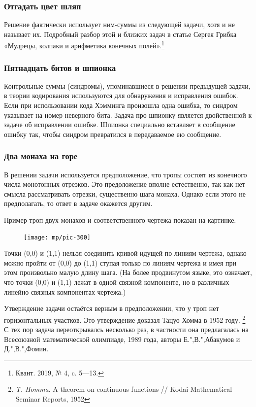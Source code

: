 \documentclass[twoside]{book}
\begin{document}
\subsubsection*{Отгадать цвет шляп}
Решение фактически использует ним-суммы из следующей задачи, хотя и не называет их.
Подробный разбор этой и близких задач в статье Сергея Грибка «Мудрецы, колпаки и арифметика конечных полей».\footnote{Квант. 2019, № 4, c. 5—13.}

\subsubsection{Пятнадцать битов и шпионка}
Контрольные суммы (синдромы), упоминавшиеся  в решении предыдущей задачи, в теории кодирования используются для обнаружения и исправления ошибок.
Если при использовании кода Хэмминга произошла одна ошибка, то синдром указывает на номер неверного бита.
Задача про шпионку является двойственной к задаче об исправлении ошибке.
Шпионка специально вставляет в сообщение ошибку так, чтобы синдром превратился в передаваемое ею сообщение.

\subsubsection{Два монаха на горе}
В решении задачи используется предположение, что тропы состоят из конечного числа монотонных отрезков.
Это предоложение вполне естественно, так как нет смысла рассматривать отрезки, существенно  шага монаха.
Однако если этого не предполагать, то ответ в задаче окажется другим.

Пример троп двух монахов и соответственного чертежа показан на картинке.
\begin{figure}[ht!]
\vskip-0mm
\centering
\texttt{[image: mp/pic-300]}
\end{figure}
Точки (0,0) и (1,1) нельзя соединить кривой идущей по линиям чертежа, 
однако можно пройти от (0,0) до (1,1) ступая только по линиям чертежа и имея при этом произвольно малую длину шага.
(На более продвинутом языке, это означает, что точки (0,0) и (1,1) лежат в одной связной компоненте, но в различных линейно связных компонентах чертежа.)

Утверждение задачи остаётся верным в предположении, что у троп нет горизонтальных участков.
Это утверждение доказал Тацуо Хомма в 1952 году.%
\footnote{\emph{T. Homma}. A theorem on continuous functions /\!/ Kodai Mathematical Seminar Reports, 1952}
С тех пор задача переоткрывалсь несколько раз, в частности она предлагалась на Всесоюзной математической олимпиаде, 1989 года, авторы Е.",В.",Абакумов и Д.",В.",Фомин.
\end{document}
